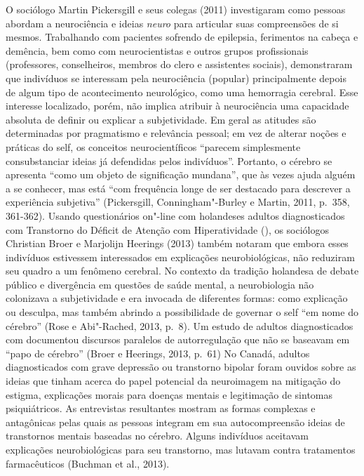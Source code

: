 O sociólogo Martin Pickersgill e seus colegas (2011) investigaram como
pessoas abordam a neurociência e ideias \emph{neuro} para articular suas
compreensões de si mesmos. Trabalhando com pacientes sofrendo de
epilepsia, ferimentos na cabeça e demência, bem como com neurocientistas
e outros grupos profissionais (professores, conselheiros, membros do
clero e assistentes sociais), demonstraram que indivíduos se interessam
pela neurociência (popular) principalmente depois de algum tipo de
acontecimento neurológico, como uma hemorragia cerebral. Esse interesse
localizado, porém, não implica atribuir à neurociência uma capacidade
absoluta de definir ou explicar a subjetividade. Em geral as atitudes
são determinadas por pragmatismo e relevância pessoal; em vez de alterar
noções e práticas do self, os conceitos neurocientíficos ``parecem
simplesmente consubstanciar ideias já defendidas pelos indivíduos''.
Portanto, o cérebro se apresenta ``como um objeto de significação
mundana'', que às vezes ajuda alguém a se conhecer, mas está ``com
frequência longe de ser destacado para descrever a experiência
subjetiva'' (Pickersgill, Conningham"-Burley e Martin, 2011, p.~358,
361-362). Usando questionários on"-line com holandeses adultos
diagnosticados com Transtorno do Déficit de Atenção com Hiperatividade
(), os sociólogos Christian Broer e Marjolijn Heerings (2013) também
notaram que embora esses indivíduos estivessem interessados em
explicações neurobiológicas, não reduziram seu quadro a um fenômeno
cerebral. No contexto da tradição holandesa de debate público e
divergência em questões de saúde mental, a neurobiologia não colonizava
a subjetividade e era invocada de diferentes formas: como explicação ou
desculpa, mas também abrindo a possibilidade de governar o self ``em
nome do cérebro'' (Rose e Abi"-Rached, 2013, p.~8). Um estudo de adultos
diagnosticados com  documentou discursos paralelos de autorregulação
que não se baseavam em ``papo de cérebro'' (Broer e Heerings, 2013,
p.~61) No Canadá, adultos diagnosticados com grave depressão ou
transtorno bipolar foram ouvidos sobre as ideias que tinham acerca do
papel potencial da neuroimagem na mitigação do estigma, explicações
morais para doenças mentais e legitimação de sintomas psiquiátricos. As
entrevistas resultantes mostram as formas complexas e antagônicas pelas
quais as pessoas integram em sua autocompreensão ideias de transtornos
mentais baseadas no cérebro. Alguns indivíduos aceitavam explicações
neurobiológicas para seu transtorno, mas lutavam contra tratamentos
farmacêuticos (Buchman et al., 2013).


